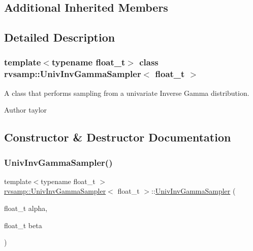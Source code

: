 \subsection*{Additional Inherited Members}


\subsection{Detailed Description}
\subsubsection*{template$<$typename float\+\_\+t$>$\newline
class rvsamp\+::\+Univ\+Inv\+Gamma\+Sampler$<$ float\+\_\+t $>$}

A class that performs sampling from a univariate Inverse Gamma distribution. 

\begin{DoxyAuthor}{Author}
taylor 
\end{DoxyAuthor}


\subsection{Constructor \& Destructor Documentation}
\mbox{\label{classrvsamp_1_1UnivInvGammaSampler_a90cc04cdd50c15b4795b4f70dbb9dcb5}} 
\subsubsection{\texorpdfstring{Univ\+Inv\+Gamma\+Sampler()}{UnivInvGammaSampler()}}
{\footnotesize\ttfamily template$<$typename float\+\_\+t $>$ \\
\hyperlink{classrvsamp_1_1UnivInvGammaSampler}{rvsamp\+::\+Univ\+Inv\+Gamma\+Sampler}$<$ float\+\_\+t $>$\+::\hyperlink{classrvsamp_1_1UnivInvGammaSampler}{Univ\+Inv\+Gamma\+Sampler} (\begin{DoxyParamCaption}\item[{float\+\_\+t}]{alpha,  }\item[{float\+\_\+t}]{beta }\end{DoxyParamCaption})}


